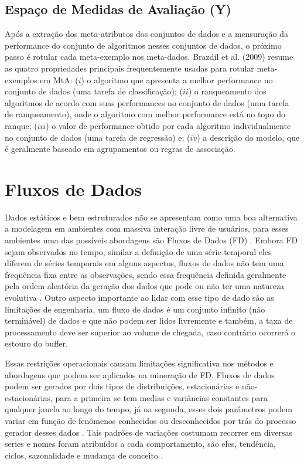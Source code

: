 \subsection{Espaço de Medidas de Avaliação (Y)}
Após a extração dos meta-atributos dos conjuntos de dados e a mensuração da
performance do conjunto de algoritmos nesses conjuntos de dados, o próximo
passo é rotular cada meta-exemplo nos meta-dados.
Brazdil et al. (2009) \cite{Brazdil2009} resume as quatro propriedades
principais frequentemente usadas para rotular meta-exemplos em MtA: ($i$)
o algoritmo que apresenta a melhor performance no conjunto de dados (uma tarefa
de classificação); ($ii$) o ranqueamento dos algoritmos de acordo com suas
performances no conjunto de dados (uma tarefa de ranqueamento), onde o
algoritmo com melhor performance está no topo do ranque; ($iii$) o valor de
performance obtido por cada algoritmo individualmente no conjunto de dados (uma
tarefa de regressão) e; ($iv$) a descrição do modelo, que é geralmente baseado
em agrupamentos ou regras de associação.

\section{Fluxos de Dados}
\label{sec:datastreams}
Dados estáticos e bem estruturados não se apresentam como uma boa alternativa a
modelagem em ambientes com massiva interação livre de usuários, para esses
ambientes uma das possíveis abordagens são Fluxos de
Dados (FD) \cite{babcock2002models}.
Embora FD sejam observados no tempo, similar a definição de uma
série temporal eles diferem de séries temporais em alguns aspectos, fluxos de
dados não tem uma frequência fixa entre as observações, sendo essa frequência
definida geralmente pela ordem aleatória da geração dos dados que pode ou não
ter uma natureza evolutiva \cite{gama2007learning}. Outro aspecto importante
ao lidar com esse tipo de dado são as limitações de engenharia, um fluxo de dados é um
conjunto infinito (não terminável) de dados e que não podem ser lidos
livremente \cite{babcock2002models} e também, a taxa de processamento deve ser superior ao volume de chegada, caso contrário ocorrerá o estouro do buffer.

Essas restrições operacionais causam limitações significativa nos métodos e
abordagens que podem ser aplicados na mineração de FD. Fluxos de dados podem ser gerados por dois tipos de distribuições, estacionárias e
não-estacionárias, para a primeira se tem medias e variâncias constantes para
qualquer janela ao longo do tempo, já na segunda, esses dois parâmetros podem
variar em função de fenômenos conhecidos ou desconhecidos por trás do processo
gerador desses dados \cite{read2018concept}. Tais padrões de variações costumam
recorrer em diversas series e nomes foram atribuídos a cada
comportamento, são eles, tendência, ciclos, sazonalidade e mudança de conceito
\cite{hyndman2018forecasting,tsymbal2004problem,brockwell2016introduction}.

